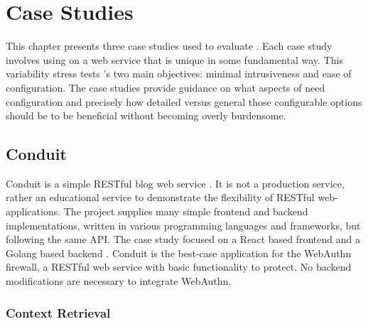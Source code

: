 
\chapter{Case Studies}\label{Chap:CaseStudies}

This chapter presents three case studies used to evaluate \sys{}. Each case study involves using \sys{} on a web service that is unique in some fundamental way. This variability stress tests \sys{}'s two main objectives: minimal intrusiveness and ease of configuration. The case studies provide guidance on what aspects of \sys{} need configuration and precisely how detailed versus general those configurable options should be to be beneficial without becoming overly burdensome.

\section{Conduit}

Conduit is a simple RESTful blog web service \cite{conduit}. It is not a production service, rather an educational service to demonstrate the flexibility of RESTful web-applications. The project supplies many simple frontend and backend implementations, written in various programming languages and frameworks, but following the same API. The case study focused on a React based frontend \cite{conduit-frontend} and a Golang based backend \cite{conduit-backend}. Conduit is the best-case application for the WebAuthn firewall, a RESTful web service with basic functionality to protect. No backend modifications are necessary to integrate WebAuthn.



\subsection{Context Retrieval}\label{Sec:Conduit_ContextRetrieval}

